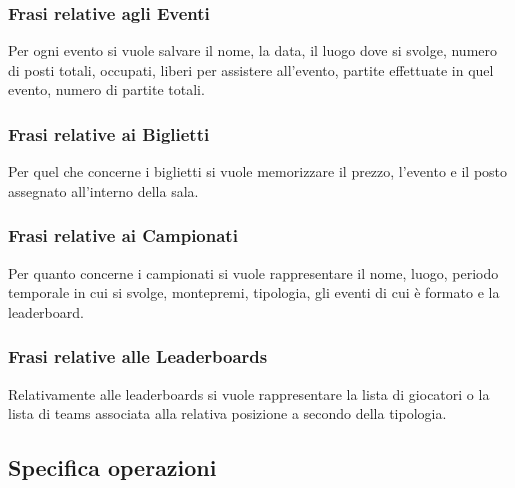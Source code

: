\documentclass{article}
\begin{document}
\subsubsection{Frasi relative agli Eventi}

Per ogni evento si vuole salvare il nome, la data, il luogo dove si svolge, numero di posti totali, occupati, liberi per assistere all'evento, partite effettuate in quel evento, numero di partite totali.

\subsubsection{Frasi relative ai Biglietti}

Per quel che concerne i biglietti si vuole memorizzare il prezzo, l'evento e il posto assegnato all'interno della sala.

\subsubsection{Frasi relative ai Campionati}

Per quanto concerne i campionati si vuole rappresentare il nome, luogo, periodo temporale in cui si svolge, montepremi, tipologia, gli eventi di cui è formato e la leaderboard.

\subsubsection{Frasi relative alle Leaderboards}

Relativamente alle leaderboards si vuole rappresentare la lista di giocatori o la lista di teams associata alla relativa posizione a secondo della tipologia.

\subsection{Specifica operazioni}
\end{document}
